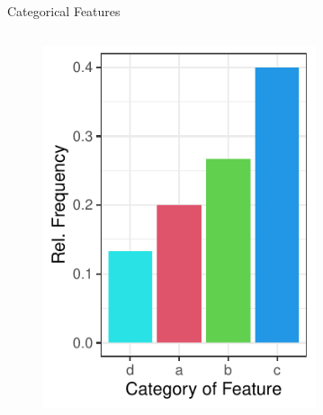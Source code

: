 \documentclass[11pt,compress,t,notes=noshow, xcolor=table]{beamer}
\begin{document}
\begin{frame}[noframenumbering]{Categorical Features}
\begin{columns}
\begin{column}{0.33\textwidth}
\begin{figure}
  \includegraphics[width=0.8\textwidth]{figure/categoryplot-binary2.pdf}
  \end{figure}
  \end{column}
  \begin{column}{0.33\textwidth}
  \end{column}
  \end{columns}

\end{frame}
\end{document}

